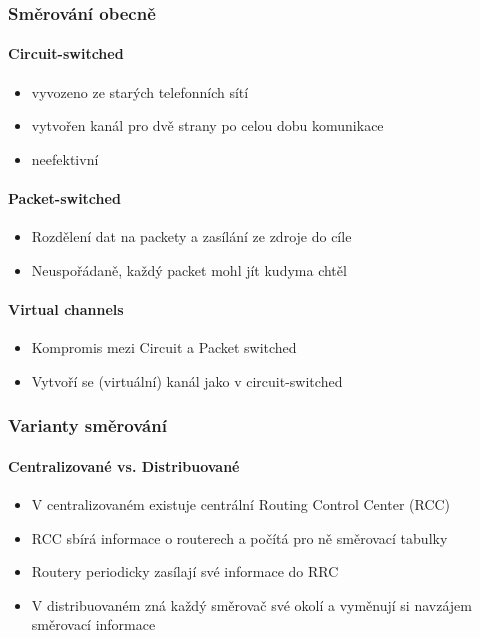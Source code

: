 \documentclass[10pt,a4paper]{article}
\begin{document}
\subsubsection{Směrování obecně}
\paragraph{Circuit-switched}
\begin{itemize}
\item vyvozeno ze starých telefonních sítí
\item vytvořen kanál pro dvě strany po celou dobu komunikace
\item neefektivní
\end{itemize}
\paragraph{Packet-switched}
\begin{itemize}
\item Rozdělení dat na packety a zasílání ze zdroje do cíle
\item Neuspořádaně, každý packet mohl jít kudyma chtěl
\end{itemize}
\paragraph{Virtual channels}
\begin{itemize}
\item Kompromis mezi Circuit a Packet switched
\item Vytvoří se (virtuální) kanál jako v circuit-switched
\end{itemize}
\subsubsection{Varianty směrování}
\paragraph{Centralizované vs. Distribuované}
\begin{itemize}
\item V centralizovaném existuje centrální Routing Control Center (RCC)
\item RCC sbírá informace o routerech a počítá pro ně směrovací tabulky
\item Routery periodicky zasílají své informace do RRC
\item V distribuovaném zná každý směrovač své okolí a vyměnují si navzájem směrovací informace
\end{itemize}
\end{document}
